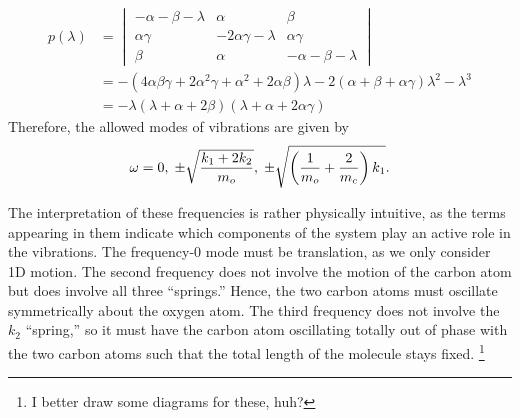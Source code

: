 \begin{align*}
    p(\lambda)
    &= \begin{vmatrix}
        -\alpha - \beta - \lambda & \alpha                   & \beta                     \\
        \alpha\gamma              & -2\alpha\gamma - \lambda & \alpha\gamma              \\
        \beta                     & \alpha                   & -\alpha - \beta - \lambda
    \end{vmatrix} \\
    &= -\left(
        4\alpha\beta\gamma + 2\alpha^2\gamma + \alpha^2 + 2\alpha\beta
    \right)\lambda
    -2(\alpha + \beta + \alpha\gamma)\lambda^2
    -\lambda^3 \\
    &= -\lambda
    (\lambda + \alpha + 2\beta)
    (\lambda + \alpha + 2\alpha\gamma)
\end{align*}
Therefore, the allowed modes of vibrations are given by
\[
    \omega = 0,\;
    \pm\sqrt{\frac{k_1 + 2k_2}{m_o}},\;
    \pm\sqrt{\left( \frac{1}{m_o} + \frac{2}{m_c} \right) k_1}.
\]

The interpretation of these frequencies is rather physically intuitive,
as the terms appearing in them indicate which components of the system play an active role in the vibrations.
The frequency-0 mode must be translation, as we only consider 1D motion.
The second frequency does not involve the motion of the carbon atom but does involve all three ``springs.''
Hence, the two carbon atoms must oscillate symmetrically about the oxygen atom.
The third frequency does not involve the $k_2$ ``spring,''
so it must have the carbon atom oscillating totally out of phase
with the two carbon atoms
such that the total length of the molecule stays fixed.%
\footnote{I better draw some diagrams for these, huh?}
